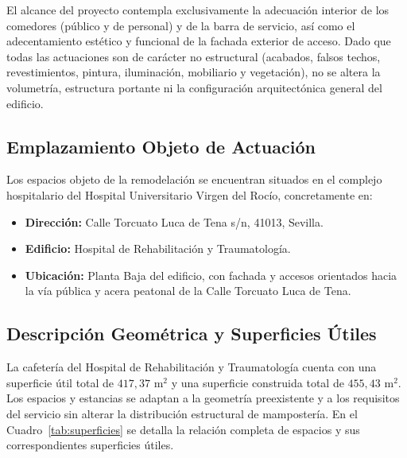 El alcance del proyecto contempla exclusivamente la adecuación interior de los comedores (público y de personal) y de la barra de servicio, así como el adecentamiento estético y funcional de la fachada exterior de acceso. Dado que todas las actuaciones son de carácter no estructural (acabados, falsos techos, revestimientos, pintura, iluminación, mobiliario y vegetación), no se altera la volumetría, estructura portante ni la configuración arquitectónica general del edificio.

\subsection{Emplazamiento Objeto de Actuación}
Los espacios objeto de la remodelación se encuentran situados en el complejo hospitalario del Hospital Universitario Virgen del Rocío, concretamente en:
\begin{itemize}
    \item \textbf{Dirección:} Calle Torcuato Luca de Tena s/n, 41013, Sevilla.
    \item \textbf{Edificio:} Hospital de Rehabilitación y Traumatología.
    \item \textbf{Ubicación:} Planta Baja del edificio, con fachada y accesos orientados hacia la vía pública y acera peatonal de la Calle Torcuato Luca de Tena.
\end{itemize}

\subsection{Descripción Geométrica y Superficies Útiles}
La cafetería del Hospital de Rehabilitación y Traumatología cuenta con una superficie útil total de $417,37\text{ m}^2$ y una superficie construida total de $455,43\text{ m}^2$. Los espacios y estancias se adaptan a la geometría preexistente y a los requisitos del servicio sin alterar la distribución estructural de mampostería. En el Cuadro~\ref{tab:superficies} se detalla la relación completa de espacios y sus correspondientes superficies útiles.


